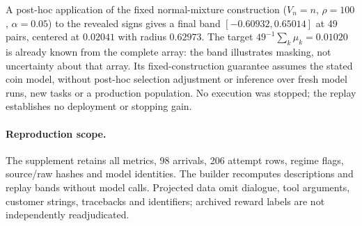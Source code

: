 A post-hoc application of the fixed normal-mixture construction
($V_n=n$, $\rho=100$, $\alpha=0.05$) to the revealed signs gives a
final band $[-0.60932,0.65014]$ at 49 pairs, centered at $0.02041$ with
radius $0.62973$. The target $49^{-1}\sum_k\mu_k=0.01020$ is already
known from the complete array: the band illustrates masking, not uncertainty
about that array. Its fixed-construction guarantee assumes the stated coin
model, without post-hoc selection adjustment or inference over fresh model
runs, new tasks or a production population. No execution was stopped;
the replay establishes no deployment or stopping gain.

\paragraph{Reproduction scope.}
The supplement retains all metrics, 98 arrivals, 206 attempt rows, regime
flags, source/raw hashes and model identities. The builder recomputes
descriptions and replay bands without model calls. Projected data omit
dialogue, tool arguments, customer strings, tracebacks and identifiers;
archived reward labels are not independently readjudicated.
